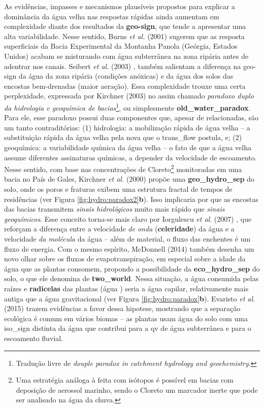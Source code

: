 \documentclass[./main.tex]{subfiles}
\begin{document}
\par As evidências, impasses e mecanismos plausíveis propostos para explicar a dominância da água velha nas respostas rápidas ainda aumentam em complexidade diante dos resultados da \textbf{\gls{geo-sign}}, que tende a apresentar uma alta variabilidade. Nesse sentido, Burns \textit{et al.} (2001) \cite{burns2001quantifying} sugerem que as resposta superficiais da Bacia Experimental da Montanha Panola (Geórgia, Estados Unidos) acabam se misturando com água subterrânea na zona ripária antes de adentrar nos canais. Seibert \textit{et al.} (2003) \cite{seibert2003groundwater}, também salientam a diferença na \gls{geo-sign} da água da zona ripária (condições anóxicas) e da água dos solos das encostas bem-drenadas (maior aeração). Essa complexidade trouxe uma certa perplexidade, expressada por Kirchner (2003) \cite{Kirchner2003} no assim chamado \textit{paradoxo duplo da hidrologia e geoquímica de bacias}\footnote{Tradução livre de \textit{douple paradox in catchment hydrology and geochemistry}.}, ou simplesmente \textbf{\gls{old_water_paradox}}. Para ele, esse paradoxo possui duas componentes que, apesar de relacionadas, são um tanto contraditórias: (1) hidrologia: a mobilização rápida de água velha -- a substituição rápida da água velha pela nova que o \gls{trans_flow} postula, e; (2) geoquímica: a variabilidade química da água velha -- o fato de que a água velha assume diferentes assinaturas químicas, a depender da velocidade de escoamento. Nesse sentido, com base nas concentrações de Cloreto\footnote{Uma estratégia análoga à feita com isótopos é possível em bacias com deposição de aerossol marinho, sendo o Cloreto um marcador inerte que pode ser analisado na água da chuva.} monitoradas em uma bacia no País de Gales, Kirchner \textit{et al.} (2000) \cite{kirchner2000} propõe uma \textbf{\gls{geo_hydro_sep}} do solo, onde os poros e fraturas exibem uma estrutura fractal de tempos de residências (ver Figura \ref{fig:hydro:paradox2}\textbf{b}). Isso implicaria por que as encostas das bacias transmitem \textit{sinais hidrológicos} muito mais rápido que \textit{sinais geoquímicos}. Esse conceito torna-se mais claro por Iorgulescu \textit{et al}. (2007) \cite{Iorgulescu2007}, que reforçam a diferença entre a velocidade \textit{de onda} (\textbf{celeridade}) da água e a velocidade \textit{da molécula} da água -- além de material, o fluxo das enchentes é um fluxo de energia. Com o mesmo espírito, McDonnell (2014) \cite{mcdonnell2014} também desenha um novo olhar sobre os fluxos de evapotranspiração, em especial sobre a idade da água que as plantas consomem, propondo a possibilidade da \textbf{\gls{eco_hydro_sep}} do solo, o que ele denomina de \textbf{\gls{two_world}}. Nessa situação, a água consumida pelas raízes e \textbf{radicelas} das plantas (água ) seria a água capilar, relativamente mais antiga que a água gravitacional (ver Figura \ref{fig:hydro:paradox}\textbf{b}). Evaristo \textit{et al.} (2015) \cite{Evaristo2015} trazem evidências a favor dessa \gls{hipotese}, mostrando que a separação ecológica é comum em vários biomas -- as plantas usam água do solo com uma \gls{iso_sign} distinta da água que contribui para a \gls{qv} de água subterrânea e para o escoamento fluvial.
\end{document}
